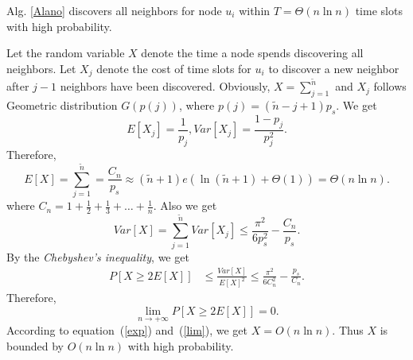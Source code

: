 \begin{theorem}
Alg. \ref{Alano} discovers all neighbors for node $u_i$ within $T=\Theta(n\ln n)$ time slots with high probability.
\end{theorem}
\begin{IEEEproof}
	Let the random variable $X$ denote the time a node spends
	discovering all neighbors. Let $X_j$ denote the cost of time slots 
	for $u_i$ to discover a new neighbor after $j-1$ neighbors have been discovered.
	Obviously, $X = \sum_{j=1}^{\widetilde{n}}$ and $X_j$ follows Geometric distribution
	$G(p(j))$, where $p(j)=(\widetilde{n}-j+1)p_s$.
	We get 
	\begin{equation*} 
		E[X_j]=\frac{1}{p_j}, Var[X_j]= \frac{1-p_j}{p_j^2}.
	\end{equation*} 
	Therefore,
	\begin{equation}
		\label{exp}
		E[X]=\sum_{j=1}^{\widetilde{n}} = \frac{C_n}{p_s}
		\approx 
		(\widetilde{n}+1)e(\ln (\widetilde{n}+1) + \Theta(1)) = \Theta(n\ln n).
	\end{equation}
	where $C_n = 1 + \frac{1}{2} + \frac{1}{3} + \dots + \frac{1}{n}$.
	Also we get
	\begin{equation*}
		Var[X] = \sum_{j=1}^{\widetilde{n}}Var[X_j] \le \frac{\pi^2}{6p_{s}^2}-\frac{C_n}{p_{s}}.
	\end{equation*}
	By the \emph{Chebyshev's inequality}, we get
	\begin{equation*}
		\begin{split}
			P[X \geq 2E[X]] &\leq \frac{Var[X]}{{E[X]}^2} 
			\leq \frac{\pi^2}{6C_n^2}-\frac{p_{s}}{C_n}.
		\end{split}
	\end{equation*}
	Therefore,
	\begin{equation}
		\label{lim}
		\lim_{n \to +\infty}P[X \geq 2E[X]] = 0.
	\end{equation}
	According to equation~(\ref{exp}) and~(\ref{lim}), we get
	$X = O(n\ln n)$.
	Thus $X$ is bounded by $O(n\ln n)$ with high probability.

\end{IEEEproof}
		
	


